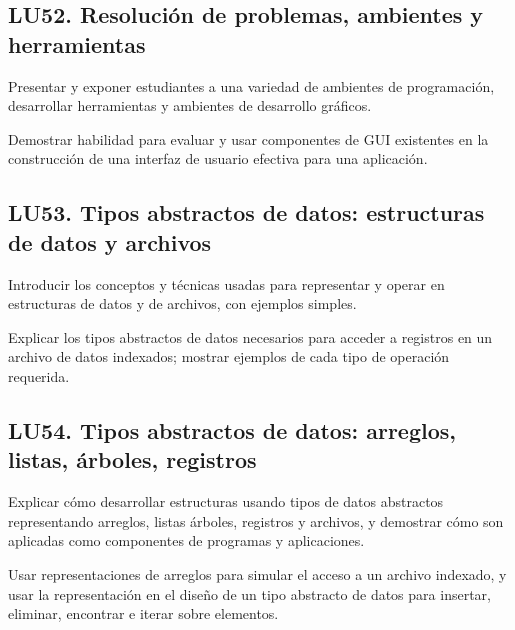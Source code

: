 \subsection{LU52. Resolución de problemas, ambientes y herramientas}\label{sec:LU52}
\begin{LearningUnit}
\begin{LUGoal}
\item Presentar y exponer estudiantes a una variedad de ambientes de programación, desarrollar herramientas y ambientes de desarrollo gráficos.
\end{LUGoal}

\begin{LUObjective}
\item Demostrar habilidad para evaluar y usar componentes de GUI existentes en la construcción de una interfaz de usuario efectiva para una aplicación.
\end{LUObjective}
\end{LearningUnit}

\subsection{LU53. Tipos abstractos de datos: estructuras de datos y archivos}\label{sec:LU53}
\begin{LearningUnit}
\begin{LUGoal}
\item Introducir los conceptos y técnicas usadas para representar y operar en estructuras de datos y de archivos, con ejemplos simples.
\end{LUGoal}

\begin{LUObjective}
\item Explicar los tipos abstractos de datos necesarios para acceder a registros en un archivo de datos indexados; mostrar ejemplos de cada tipo de operación requerida.
\end{LUObjective}
\end{LearningUnit}

\subsection{LU54. Tipos abstractos de datos: arreglos, listas, árboles, registros}\label{sec:LU54}
\begin{LearningUnit}
\begin{LUGoal}
\item Explicar cómo desarrollar estructuras usando tipos de datos abstractos representando arreglos, listas árboles, registros y archivos, y demostrar cómo son aplicadas como componentes de programas y aplicaciones.
\end{LUGoal}

\begin{LUObjective}
\item Usar representaciones de arreglos para simular el acceso a un archivo indexado, y usar la representación en el diseño de un tipo abstracto de datos para insertar, eliminar, encontrar e iterar sobre elementos.
\end{LUObjective}
\end{LearningUnit}

